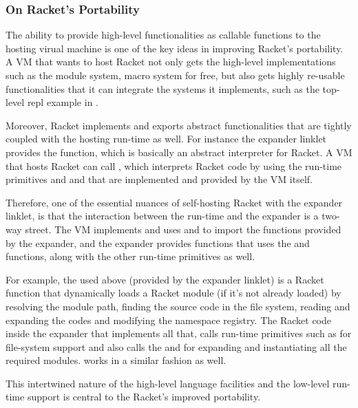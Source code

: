 \subsubsection{On Racket's Portability}
\label{subsec:portability}

The ability to provide high-level functionalities as callable
functions to the hosting virual machine is one of the key ideas in
improving Racket's portability. A VM that wants to host Racket not
only gets the high-level implementations such as the module system,
macro system for free, but also gets highly re-usable functionalities
that it can integrate the systems it implements, such as the top-level
repl example in .

Moreover, Racket implements and exports abstract functionalities that
are tightly coupled with the hosting run-time as well. For instance
the expander linklet provides the  function, which is
basically an abstract interpreter for Racket. A VM that hosts Racket
can call , which interprets Racket code by using the
run-time primitives and 
and  that are implemented and provided
by the VM itself.

Therefore, one of the essential nuances of self-hosting Racket with
the expander linklet, is that the interaction between the run-time and
the expander is a two-way street. The VM implements and uses
 and  to
import the functions provided by the expander, and the expander
provides functions that uses the  and
 functions, along with the other
run-time primitives as well.

For example, the  used above (provided by
the expander linklet) is a Racket function that dynamically loads a
Racket module (if it's not already loaded) by resolving the module
path, finding the source code in the file system, reading and
expanding the codes and modifying the namespace registry. The Racket
code inside the expander that implements all that, calls run-time
primitives such as for file-system support and also calls the
 and  for
expanding and instantiating all the required
modules.  works in a similar fashion as well.

This intertwined nature of the high-level language facilities and the
low-level run-time support is central to the Racket's improved
portability.
